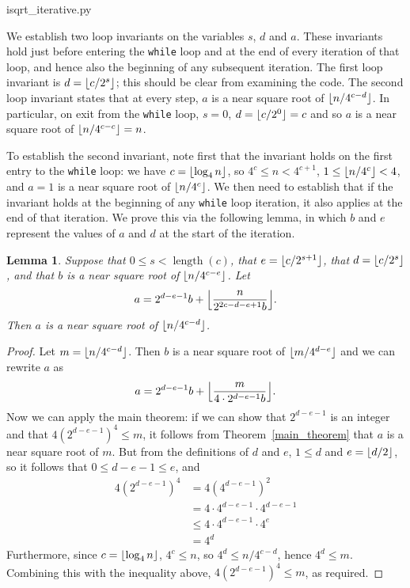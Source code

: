 \documentclass[a4paper]{article}
\DeclarePairedDelimiter\floor{\lfloor}{\rfloor}
\DeclareMathOperator{\length}{length}
\theoremstyle{plain}
\newtheorem{lemma}[theorem]{Lemma}
\theoremstyle{definition}
\begin{document}

  {isqrt_iterative.py}


We establish two loop invariants on the variables $s$, $d$ and $a$. These
invariants hold just before entering the \lstinline$while$ loop and at the end
of every iteration of that loop, and hence also the beginning of any subsequent
iteration. The first loop invariant is $d = \floor{c/2^s}$; this should be
clear from examining the code. The second loop invariant states that at every
step, $a$ is a near square root of $\floor{n / 4^{c-d}}$. In particular, on
exit from the \lstinline$while$ loop, $s = 0$, $d = \floor{c/2^0} = c$ and so
$a$ is a near square root of $\floor{n / 4^{c-c}} = n$.

To establish the second invariant, note first that the invariant holds on the
first entry to the \lstinline$while$ loop: we have $c = \floor{\log_4 n}$, so
$4^c \le n < 4^{c+1}$, $1 \le \floor{n / 4^c} < 4$, and $a = 1$ is a near
square root of $\floor{n / 4^c}$. We then need to establish that if the
invariant holds at the beginning of any \lstinline$while$ loop iteration, it
also applies at the end of that iteration. We prove this via the following
lemma, in which $b$ and $e$ represent the values of $a$ and $d$ at the start of
the iteration.

\begin{lemma}
  Suppose that $0 \le s < \length(c)$, that $e = \floor{c / 2^{s + 1}}$, that
  $d = \floor{c / 2^s}$, and that $b$ is a near square root of $\floor{n /
  4^{c-e}}$. Let
  $$a = 2^{d-e-1}b + \floor*{\frac{n}{2^{2c-d-e+1}b}}.$$ Then $a$ is a near
  square root of $\floor{n / 4^{c-d}}$.
\end{lemma}

\begin{proof}
  Let $m = \floor{n / 4^{c-d}}$. Then $b$ is a near square root of
  $\floor{m/4^{d-e}}$ and we can rewrite $a$ as
  $$a = 2^{d-e-1}b + \floor*{\frac{m}{4\cdot 2^{d-e-1}b}}.$$ Now we can apply
  the main theorem: if we can show that $2^{d-e-1}$ is an integer and that
  $4(2^{d-e-1})^4 \le m$, it follows from Theorem~\ref{main_theorem} that $a$
  is a near square root of $m$. But from the definitions of $d$ and $e$, $1 \le
  d$ and $e = \floor{d/2}$, so it follows that $0 \le d - e - 1 \le e$, and
  \begin{align*}
    4(2^{d-e-1})^4 &= 4(4^{d-e-1})^2 \\
                  &= 4\cdot 4^{d-e-1}\cdot 4^{d-e-1} \\
                  &\le 4\cdot 4^{d-e-1}\cdot 4^e \\
                  &= 4^d
  \end{align*}
  Furthermore, since $c = \floor{\log_4 n}$, $4^c \le n$, so $4^d \le n /
  4^{c-d}$, hence $4^d \le m$. Combining this with the inequality above,
  $4(2^{d-e-1})^4 \le m$, as required.
\end{proof}
\end{document}
